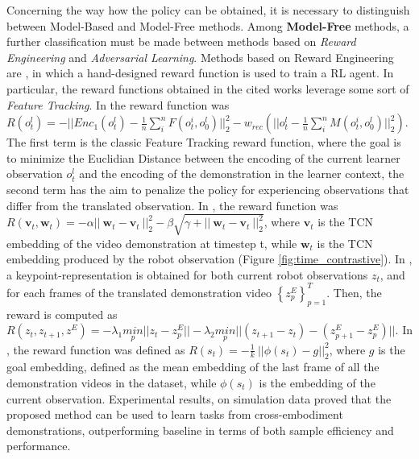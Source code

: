 Concerning the way how the policy can be obtained, it is necessary to distinguish between Model-Based and Model-Free methods.
\newline Among \textbf{Model-Free} methods, a further classification must be made between methods based on \textit{Reward Engineering} and \textit{Adversarial Learning}.
\newline Methods based on Reward Engineering are \cite{liu2018imitation_from_observation,sermanet2018time_contrastive,xiong2021learning_by_watching,zakka2022xirl}, in which a hand-designed reward function is used to train a RL agent. In particular, the reward functions obtained in the cited works leverage some sort of \textit{Feature Tracking}. In \cite{liu2018imitation_from_observation} the reward function was $R(o^{l}_{t}) = -||Enc_{1}(o^{l}_{t}) - \frac{1}{n} \sum_{i}^{n}F(o_{t}^{i},o_{0}^{l})||^{2}_{2} - w_{rec} (||o^{l}_{t} - \frac{1}{n} \sum_{i}^{n}M(o_{t}^{i},o_{0}^{l})||^{2}_{2})$. The first term is the classic Feature Tracking reward function, where the goal is to minimize the Euclidian Distance between the encoding of the current learner observation $o^{l}_{t}$ and the encoding of the demonstration in the learner context, the second term has the aim to penalize the policy for experiencing observations that differ from the translated observation.
In \cite{sermanet2018time_contrastive}, the reward function was $R(\textbf{v}_{t}, \textbf{w}_{t}) = - \alpha || \ \textbf{w}_{t} - \textbf{v}_{t} \ ||^{2}_{2} - \beta \sqrt{\gamma + || \ \textbf{w}_{t} - \textbf{v}_{t} \ ||^{2}_{2}}$, where $\textbf{v}_{t}$ is the TCN embedding of the video demonstration at timestep t, while $\textbf{w}_{t}$ is the TCN embedding produced by the robot observation (Figure \ref{fig:time_contrastive}).
In \cite{xiong2021learning_by_watching}, a keypoint-representation is obtained for both current robot observations $z_{t}$, and for each frames of the translated demonstration video $\left\{z^{E}_{p}\right\}_{p=1}^{T}$. Then, the reward is computed as $R(z_{t},z_{t+1},z^{E}) = - \lambda_{1} \underset{p}{min} ||z_{t}-z^{E}_{p}|| - \lambda_{2} \underset{p}{min} ||(z_{t+1}-z_{t}) - (z^{E}_{p+1}-z^{E}_{p})||$. %
In \cite{zakka2022xirl}, the reward function was defined as $R(s_{t}) = -\frac{1}{k} \ || \phi(s_{t}) - g||^{2}_{2}$, where $g$ is the goal embedding, defined as the mean embedding of the last frame of all the demonstration videos in the dataset, while $\phi(s_{t})$ is the embedding of the current observation. Experimental results, on simulation data proved that the proposed method can be used to learn tasks from cross-embodiment demonstrations, outperforming baseline \cite{sermanet2018time_contrastive} in terms of both sample efficiency and performance.%

